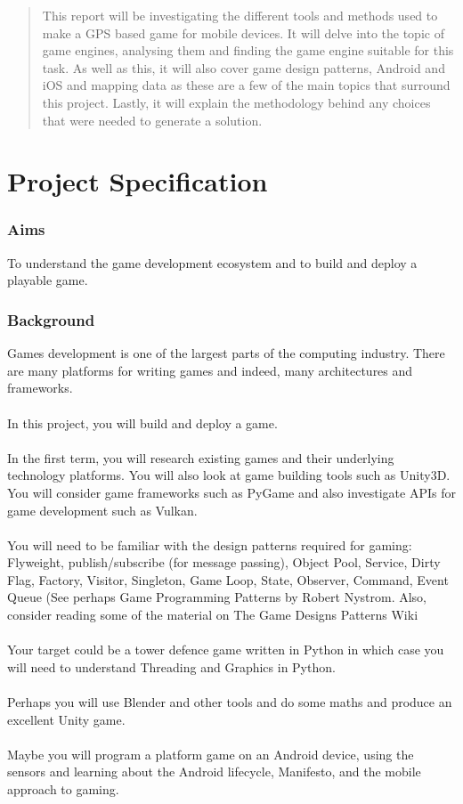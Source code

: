 \documentclass[a4paper]{report}
\begin{document}
\begin{abstract}

This report will be investigating the different tools and methods used to make a GPS based game for mobile devices. It will delve into the topic of game engines, analysing them and finding the game engine suitable for this task. As well as this, it will also cover game design patterns, Android and iOS and mapping data as these are a few of the main topics that surround this project. Lastly, it will explain the methodology behind any choices that were needed to generate a solution.

\end{abstract}
\newpage


\chapter*{Project Specification}
\subsection*{Aims}
To understand the game development ecosystem and to build and deploy a playable game.
\subsection*{Background}
Games development is one of the largest parts of the computing industry. There are many platforms for writing games and indeed, many architectures and frameworks.
\\\\
In this project, you will build and deploy a game.
\\\\
In the first term, you will research existing games and their underlying technology platforms. You will also look at game building tools such as Unity3D. You will consider game frameworks such as PyGame and also investigate APIs for game development such as Vulkan.
\\\\
You will need to be familiar with the design patterns required for gaming: Flyweight, publish/subscribe (for message passing), Object Pool, Service, Dirty Flag, Factory, Visitor, Singleton, Game Loop, State, Observer, Command, Event Queue (See perhaps Game Programming Patterns by Robert Nystrom. Also, consider reading some of the material on The Game Designs Patterns Wiki
\\\\
Your target could be a tower defence game written in Python in which case you will need to understand Threading and Graphics in Python.
\\\\
Perhaps you will use Blender and other tools and do some maths and produce an excellent Unity game.
\\\\
Maybe you will program a platform game on an Android device, using the sensors and learning about the Android lifecycle, Manifesto, and the mobile approach to gaming.
\end{document}

